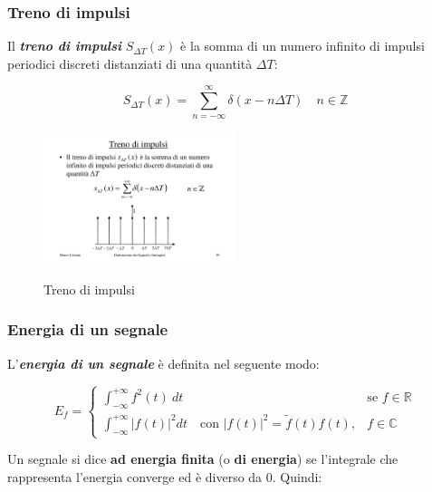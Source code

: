 \documentclass[a4paper]{article}
\begin{document}
	\newpage
	
	\subsubsection{Treno di impulsi}
	
	Il \textbf{\emph{treno di impulsi}} $S_{\Delta T}(x)$ è la somma di un numero infinito di impulsi periodici discreti distanziati di una quantità $\Delta T$:
	
	\begin{equation*}
		S_{\Delta T}(x) = \sum_{n = -\infty}^{\infty} \delta (x - n \Delta T) \hspace{1em} n \in \mathbb{Z}
	\end{equation*}

	\begin{figure}[!htp]
		\centering
		\includegraphics[width=0.5\textwidth]{img/treno_di_impulsi.pdf}\label{treno_di_impulsi}
		\caption{Treno di impulsi}
	\end{figure}

	\subsubsection{Energia di un segnale}
	
	L'\textbf{\emph{energia di un segnale}} è definita nel seguente modo:
	
	\begin{equation*}
		E_f =
		\begin{cases}
			\displaystyle \int_{-\infty}^{+\infty} f^{2}(t)\: dt & \text{se } f \in \mathbb{R} \\
			\displaystyle \int_{-\infty}^{+\infty} \left| f(t) \right|^{2} dt \hspace{1em} \text{con } \left| f(t) \right|^{2} = \tilde{f}(t) f(t), & f \in \mathbb{C}
		\end{cases}
	\end{equation*}
	
	\noindent
	Un segnale si dice \textbf{ad energia finita} (o \textbf{di energia}) se l'integrale che rappresenta l'energia converge ed è diverso da $0$. Quindi:
	
\end{document}
